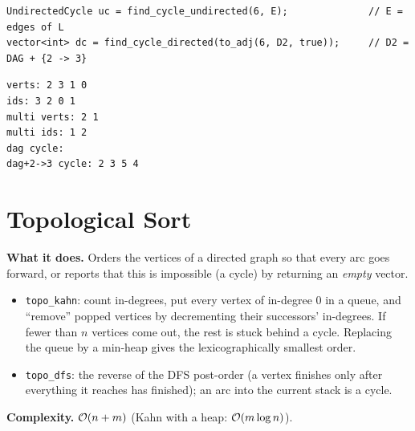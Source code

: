 \begin{lstlisting}[style=snippet]
UndirectedCycle uc = find_cycle_undirected(6, E);              // E = edges of L
vector<int> dc = find_cycle_directed(to_adj(6, D2, true));     // D2 = DAG + {2 -> 3}
\end{lstlisting}
\begin{lstlisting}[style=trace]
verts: 2 3 1 0
ids: 3 2 0 1
multi verts: 2 1
multi ids: 1 2
dag cycle:
dag+2->3 cycle: 2 3 5 4
\end{lstlisting}



\clneed
\section{Topological Sort}
\label{sec:cl-topo}

\textbf{What it does.} Orders the vertices of a directed graph so that every arc goes forward, or reports that this is impossible (a cycle) by returning an \emph{empty} vector.
\begin{itemize}[leftmargin=*]
    \item \texttt{topo\_kahn}: count in-degrees, put every vertex of in-degree 0 in a queue, and ``remove'' popped vertices by decrementing their successors' in-degrees. If fewer than $n$ vertices come out, the rest is stuck behind a cycle. Replacing the queue by a min-heap gives the lexicographically smallest order.
    \item \texttt{topo\_dfs}: the reverse of the DFS post-order (a vertex finishes only after everything it reaches has finished); an arc into the current stack is a cycle.
\end{itemize}

\textbf{Complexity.} $\mathcal{O}(n+m)$ (Kahn with a heap: $\mathcal{O}(m\log n)$).

